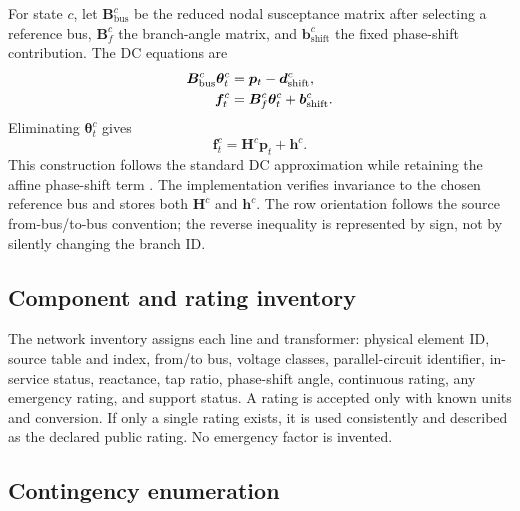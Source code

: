 \documentclass[10pt,journal,onecolumn]{IEEEtran}
\begin{document}
For state $c$, let $\bm B_{\mathrm{bus}}^c$ be the reduced nodal susceptance
matrix after selecting a reference bus, $\bm B_f^c$ the branch-angle matrix,
and $\bm b_{\mathrm{shift}}^c$ the fixed phase-shift contribution. The DC
equations are
\begin{align}
\bm B_{\mathrm{bus}}^c\bm\theta_t^c
&=\bm p_t-\bm d_{\mathrm{shift}}^c,
\notag\\
\bm f_t^c
&=\bm B_f^c\bm\theta_t^c+\bm b_{\mathrm{shift}}^c.
\end{align}
Eliminating $\bm\theta_t^c$ gives
\begin{equation}
\bm f_t^c=\bm H^c\bm p_t+\bm h^c.
\end{equation}
This construction follows the standard DC approximation while retaining the
affine phase-shift term \cite{Stott2009}. The implementation verifies invariance
to the chosen reference bus and stores both $\bm H^c$ and $\bm h^c$. The row
orientation follows the source
from-bus/to-bus convention; the reverse inequality is represented by sign, not
by silently changing the branch ID.

\subsection{Component and rating inventory}

The network inventory assigns each line and transformer:
physical element ID, source table and index, from/to bus, voltage classes,
parallel-circuit identifier, in-service status, reactance, tap ratio,
phase-shift angle, continuous rating, any emergency rating, and support status.
A rating is accepted only with known units and conversion. If only a single
rating exists, it is used consistently and described as the declared public
rating. No emergency factor is invented.

\subsection{Contingency enumeration}
\end{document}
